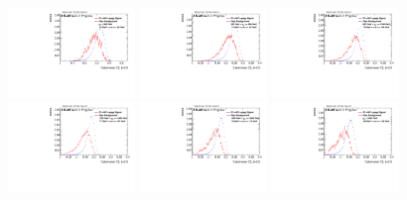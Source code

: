 \begin{figure}
\includegraphics[width=0.3\textwidth]{sascha_input/Appendix/Distributions/w/distributions/beta05/h_recoJet_C2_05_bin1.pdf} \hspace{1mm}
\includegraphics[width=0.3\textwidth]{sascha_input/Appendix/Distributions/w/distributions/beta05/h_recoJet_C2_05_bin2.pdf} \hspace{1mm}
\includegraphics[width=0.3\textwidth]{sascha_input/Appendix/Distributions/w/distributions/beta05/h_recoJet_C2_05_bin3.pdf} 
\bigskip
\includegraphics[width=0.3\textwidth]{sascha_input/Appendix/Distributions/w/distributions/beta05/h_recoJet_C2_05_bin4.pdf} \hspace{1mm}
\includegraphics[width=0.3\textwidth]{sascha_input/Appendix/Distributions/w/distributions/beta05/h_recoJet_C2_05_bin5.pdf} \hspace{1mm}
\includegraphics[width=0.3\textwidth]{sascha_input/Appendix/Distributions/w/distributions/beta05/h_recoJet_C2_05_bin6.pdf}

\end{figure}
